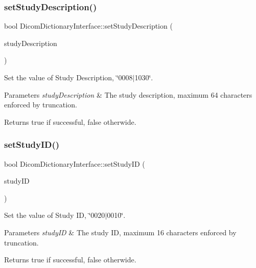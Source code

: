\subsubsection{\texorpdfstring{set\+Study\+Description()}{setStudyDescription()}}
{\footnotesize\ttfamily bool Dicom\+Dictionary\+Interface\+::set\+Study\+Description (\begin{DoxyParamCaption}\item[{Q\+String}]{study\+Description }\end{DoxyParamCaption})}



Set the value of Study Description, \char`\"{}0008$\vert$1030\char`\"{}. 


\begin{DoxyParams}{Parameters}
{\em study\+Description} & The study description, maximum 64 characters enforced by truncation. \\
\hline
\end{DoxyParams}
\begin{DoxyReturn}{Returns}
true if successful, false otherwide. 
\end{DoxyReturn}
\mbox{\label{class_dicom_dictionary_interface_a12f56660f15526764fd5d1d9e010c453}} 
\subsubsection{\texorpdfstring{set\+Study\+I\+D()}{setStudyID()}}
{\footnotesize\ttfamily bool Dicom\+Dictionary\+Interface\+::set\+Study\+ID (\begin{DoxyParamCaption}\item[{Q\+String}]{study\+ID }\end{DoxyParamCaption})}



Set the value of Study ID, \char`\"{}0020$\vert$0010\char`\"{}. 


\begin{DoxyParams}{Parameters}
{\em study\+ID} & The study ID, maximum 16 characters enforced by truncation. \\
\hline
\end{DoxyParams}
\begin{DoxyReturn}{Returns}
true if successful, false otherwide. 
\end{DoxyReturn}
\mbox{\label{class_dicom_dictionary_interface_a821babbdf04d1247086dab20c31ebccb}} 
